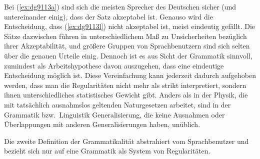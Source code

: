\begin{exe}
  \ex\label{ex:dg9113}
  \begin{xlist}
  \end{xlist}
\end{exe}

Bei (\ref{ex:dg9113a}) sind sich die meisten Sprecher des Deutschen sicher (und untereinander einig), dass der Satz akzeptabel ist.
Genauso wird die Entscheidung, dass (\ref{ex:dg9113l}) nicht akzeptabel ist, meist eindeutig gefällt.
Die Sätze dazwischen führen in unterschiedlichem Maß zu Unsicherheiten bezüglich ihrer Akzeptabilität, und größere Gruppen von Sprachbenutzern sind sich selten über die genauen Urteile einig.
Dennoch ist es aus Sicht der Grammatik sinnvoll, zumindest als Arbeitshypothese davon auszugehen, dass eine eindeutige Entscheidung möglich ist.
Diese Vereinfachung kann jederzeit dadurch aufgehoben werden, dass man die Regularitäten nicht mehr als strikt interpretiert, sondern ihnen \zB unterschiedliches statistisches Gewicht gibt.
Anders als in der Physik, die mit tatsächlich ausnahmslos geltenden Naturgesetzen arbeitet, sind in der Grammatik bzw.\ Linguistik Generalisierung, die keine Ausnahmen oder Überlappungen mit anderen Generalisierungen haben, unüblich.

Die zweite Definition der Grammatikalität abstrahiert vom Sprachbenutzer und bezieht sich nur auf eine Grammatik als System von Regularitäten.


